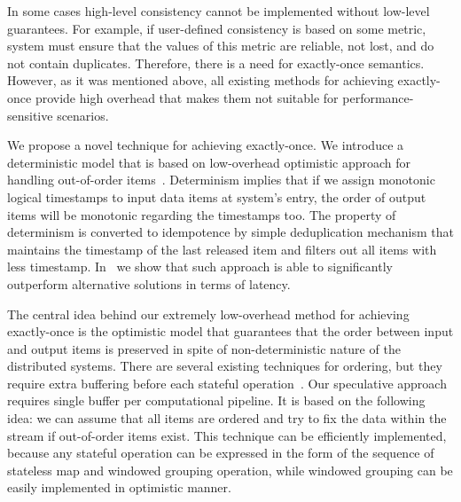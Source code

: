\label{fs-phd-optimistic}

In some cases high-level consistency cannot be implemented without low-level guarantees. For example, if user-defined consistency is based on some metric, system must ensure that the values of this metric are reliable, not lost, and do not contain duplicates. Therefore, there is a need for exactly-once semantics. However, as it was mentioned above, all existing methods for achieving exactly-once provide high overhead that makes them not suitable for performance-sensitive scenarios.

We propose a novel technique for achieving exactly-once. We introduce a deterministic model that is based on low-overhead optimistic approach for handling out-of-order items~\cite{we2018seim}. Determinism implies that if we assign monotonic logical timestamps to input data items at system's entry, the order of output items will be monotonic regarding the timestamps too. The property of determinism is converted to idempotence by simple deduplication mechanism that maintains the timestamp of the last released item and filters out all items with less timestamp. In~\cite{we2018beyondmr} we show that such approach is able to significantly outperform alternative solutions in terms of latency.

The central idea behind our extremely low-overhead method for achieving exactly-once is the optimistic model that guarantees that the order between input and output items is preserved in spite of non-deterministic nature of the distributed systems. There are several existing techniques for ordering, but they require extra buffering before each stateful operation~\cite{Li:2008:OPN:1453856.1453890}. Our speculative approach requires single buffer per computational pipeline. It is based on the following idea: we can assume that all items are ordered and try to fix the data within the stream if out-of-order items exist. This technique can be efficiently implemented, because any stateful operation can be expressed in the form of the sequence of stateless map and windowed grouping operation, while windowed grouping can be easily implemented in optimistic manner.